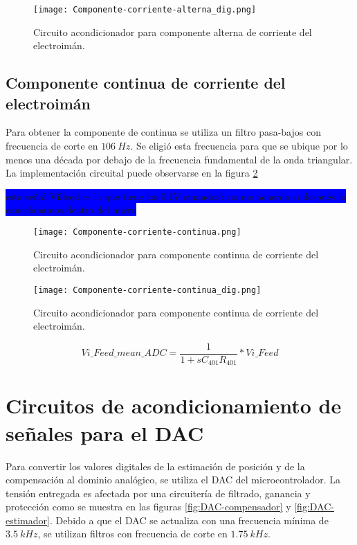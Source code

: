 \begin{figure}[H]
	\centering
	\texttt{[image: Componente-corriente-alterna\_dig.png]}
	\caption{ Circuito acondicionador para componente alterna de corriente del electroimán.
	}
	\label{fig:componente-corriente-alterna}
\end{figure}

\subsection{Componente continua de corriente del electroimán}

 Para obtener la componente de continua se utiliza un filtro pasa-bajos con frecuencia de corte en $106\:Hz$. Se eligió esta frecuencia para que se ubique por lo menos una década por debajo de la frecuencia fundamental de la onda triangular. La implementación circuital puede observarse en la figura \ref{fig:componente-corriente-continua}

\colorbox{blue}{esta señal Vilfeed es la que tiene los 0.1V sumados? no me acuerdo si después lo cancelabamos dentro del micro}

\begin{figure}[H]
	\centering
	\texttt{[image: Componente-corriente-continua.png]}
	\caption{Circuito acondicionador para componente continua de corriente del electroimán.
	}

\end{figure}

\begin{figure}[H]
	\centering
	\texttt{[image: Componente-corriente-continua\_dig.png]}
	\caption{Circuito acondicionador para componente continua de corriente del electroimán.
	}
	\label{fig:componente-corriente-continua}
\end{figure}

\begin{equation*}
	Vi\_Feed\_mean\_ADC=\frac{1}{1+sC_{401}R_{401}}*Vi\_Feed
\end{equation*}

\section{Circuitos de acondicionamiento de señales para el DAC}

 Para convertir los valores digitales de la estimación de posición y de la compensación al dominio analógico, se utiliza el DAC del microcontrolador. La tensión entregada es afectada por una circuitería de filtrado, ganancia y protección como se muestra en las figuras \ref{fig:DAC-compensador} y \ref{fig:DAC-estimador}. Debido a que el DAC se actualiza con una frecuencia mínima de $3.5\:kHz$, se utilizan filtros con frecuencia de corte en $1.75\:kHz$.

